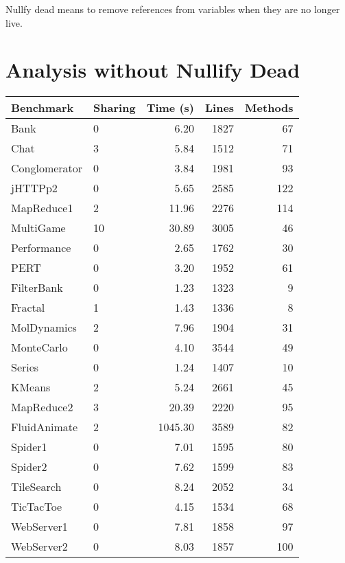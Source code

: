\documentclass{article}
\begin{document}
 
Nullfy dead means to remove references from variables when they are no
longer live.

\section{Analysis without Nullify Dead}
\begin{tabular}{|l|l|r|r|r|}
\hline
Benchmark & Sharing & Time (s) & Lines & Methods \\
\hline
Bank & 0 & 6.20 & 1827 & 67 \\
Chat & 3 & 5.84 & 1512 & 71 \\
Conglomerator & 0 & 3.84 & 1981 & 93 \\
jHTTPp2 & 0 & 5.65 & 2585 & 122 \\
MapReduce1 & 2 & 11.96 & 2276 & 114 \\
MultiGame & 10 & 30.89 & 3005 & 46 \\
Performance & 0 & 2.65 & 1762 & 30 \\
PERT & 0 & 3.20 & 1952 & 61 \\
FilterBank & 0 & 1.23 & 1323 & 9 \\
Fractal & 1 & 1.43 & 1336 & 8 \\
MolDynamics & 2 & 7.96 & 1904 & 31 \\
MonteCarlo & 0 & 4.10 & 3544 & 49 \\
Series & 0 & 1.24 & 1407 & 10 \\
KMeans & 2 & 5.24 & 2661 & 45 \\
MapReduce2 & 3 & 20.39 & 2220 & 95 \\
FluidAnimate & 2 & 1045.30 & 3589 & 82 \\
Spider1 & 0 & 7.01 & 1595 & 80 \\
Spider2 & 0 & 7.62 & 1599 & 83 \\
TileSearch & 0 & 8.24 & 2052 & 34 \\
TicTacToe & 0 & 4.15 & 1534 & 68 \\
WebServer1 & 0 & 7.81 & 1858 & 97 \\
WebServer2 & 0 & 8.03 & 1857 & 100 \\
\hline
\end{tabular}
\end{document}
